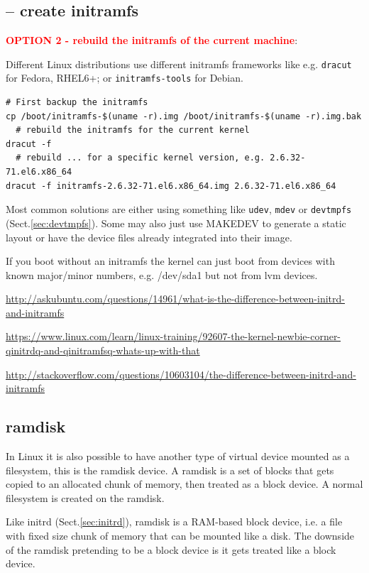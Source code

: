 \subsection{-- create initramfs}
\label{sec:initramfs-create-option-2}

\textcolor{red}{\bf OPTION 2 - rebuild the initramfs of the current machine}:
 
Different Linux distributions use different initramfs frameworks like e.g.
\verb!dracut! for Fedora, RHEL6+; or \verb!initramfs-tools! for Debian.

\begin{verbatim}
# First backup the initramfs
cp /boot/initramfs-$(uname -r).img /boot/initramfs-$(uname -r).img.bak
  # rebuild the initramfs for the current kernel
dracut -f
  # rebuild ... for a specific kernel version, e.g. 2.6.32-71.el6.x86_64
dracut -f initramfs-2.6.32-71.el6.x86_64.img 2.6.32-71.el6.x86_64
\end{verbatim}

Most common solutions are either using something like \verb!udev!, \verb!mdev!
or \verb!devtmpfs! (Sect.\ref{sec:devtmpfs}).
Some may also just use MAKEDEV to generate a static layout or have the device
files already integrated into their image.

If you boot without an initramfs the kernel can just boot from devices with
known major/minor numbers, e.g. /dev/sda1 but not from lvm devices.

\url{http://askubuntu.com/questions/14961/what-is-the-difference-between-initrd-and-initramfs}

\url{https://www.linux.com/learn/linux-training/92607-the-kernel-newbie-corner-qinitrdq-and-qinitramfsq-whats-up-with-that}

\url{http://stackoverflow.com/questions/10603104/the-difference-between-initrd-and-initramfs}

\subsection{ramdisk}
\label{sec:ramdisk}
\label{sec:RAMDISK-for-RFS}


In Linux it is also possible to have another type of virtual device mounted as a
filesystem, this is the ramdisk device. A ramdisk is a set of blocks that gets
copied to an allocated chunk of memory, then treated as a block device. A normal
filesystem is created on the ramdisk.

Like initrd (Sect.\ref{sec:initrd}), ramdisk is a RAM-based block device, i.e.
a file with fixed size chunk of memory that can be mounted like a disk.
The downside of the ramdisk pretending to be a block device is it gets treated
like a block device. 

